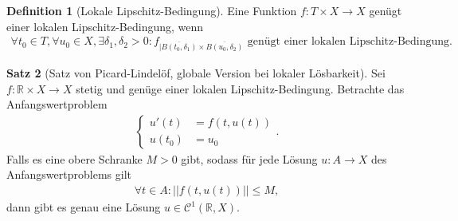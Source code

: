 \documentclass[a4paper]{article}
\theoremstyle{definition}
\newtheorem{theorem}{Satz}
\newtheorem{definition}[theorem]{Definition}
\begin{document}
\begin{definition}[Lokale Lipschitz-Bedingung]
Eine Funktion $f: T \times X \to X$ genügt einer lokalen Lipschitz-Bedingung, wenn 
\begin{align*}
    \forall t_0 \in T, \forall u_0 \in X, \exists \delta_1, \delta_2 > 0: \text{$f_{|\overline{B(t_0, \delta_1)} \times \overline{B(u_0, \delta_2)}}$ genügt einer lokalen Lipschitz-Bedingung.}
\end{align*}
\end{definition}

\begin{theorem}[Satz von Picard-Lindelöf, globale Version bei lokaler Lösbarkeit]
Sei $f: \mathbb{R}  \times X \to X$ stetig und genüge einer lokalen Lipschitz-Bedingung. Betrachte das Anfangswertproblem 
\begin{align*}
    \begin{cases}
        u'(t) &= f(t, u(t)) \\
        u(t_0) &= u_0
    \end{cases}.
\end{align*}
Falls es eine obere Schranke $M>0$ gibt, sodass für jede Lösung $u: A \to X$ des Anfangswertproblems gilt
\begin{align*}
    \forall t \in A: ||f(t,u(t))|| \leq M,
\end{align*}
dann gibt es genau eine Lösung $u \in \mathcal{C}^1(\mathbb{R}, X)$.
\end{theorem}
\end{document}
